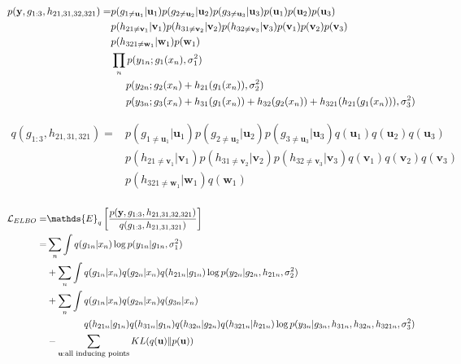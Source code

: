 \documentclass{article}
\begin{document}
\begin{align*}
	p(\mathbf{y},g_{1:3}, h_{21,31,32,321}) = &  p(g_{1\neq\mathbf{u}_1}|\mathbf{u}_1)p(g_{2\neq\mathbf{u}_2}|\mathbf{u}_2)p(g_{3\neq\mathbf{u}_3}|\mathbf{u}_3)p(\mathbf{u}_1)p(\mathbf{u}_2)p(\mathbf{u}_3)\\	
	& p(h_{21\neq\mathbf{v}_1}|\mathbf{v}_1)p(h_{31\neq\mathbf{v}_2}|\mathbf{v}_2)p(h_{32\neq\mathbf{v}_3}|\mathbf{v}_3)p(\mathbf{v}_1)p(\mathbf{v}_2)p(\mathbf{v}_3)\\	
    & p(h_{321\neq\mathbf{w}_1}|\mathbf{w}_1)p(\mathbf{w}_1)\\
    & \prod_n p(y_{1n};g_1(x_n), \sigma^2_1)\\
    & \hspace{1.5em} p(y_{2n};g_2(x_n) + h_{21}(g_1(x_n)), \sigma^2_2)\\
    & \hspace{1.5em} p(y_{3n};g_3(x_n) + h_{31}(g_1(x_n)) + h_{32}(g_2(x_n)) + h_{321}(h_{21}(g_1(x_n))), \sigma^2_3)
\end{align*}

\begin{align*}
	q(g_{1:3}, h_{21, 31, 321}) = & p(g_{1\neq\mathbf{u}_1}|\mathbf{u}_1)p(g_{2\neq\mathbf{u}_2}|\mathbf{u}_2)p(g_{3\neq\mathbf{u}_3}|\mathbf{u}_3)q(\mathbf{u}_1)q(\mathbf{u}_2)q(\mathbf{u}_3)\\
	& p(h_{21\neq\mathbf{v}_1}|\mathbf{v}_1)p(h_{31\neq\mathbf{v}_2}|\mathbf{v}_2)p(h_{32\neq\mathbf{v}_3}|\mathbf{v}_3)q(\mathbf{v}_1)q(\mathbf{v}_2)q(\mathbf{v}_3)\\	
	& p(h_{321\neq\mathbf{w}_1}|\mathbf{w}_1)q(\mathbf{w}_1)\\
\end{align*}

\begin{align*}
	\mathcal{L}_{ELBO} = & \mathds{E}_q\left[ \frac{p(\mathbf{y},g_{1:3}, h_{21,31,32,321})}{q(g_{1:3}, h_{21, 31, 321})}\right]\\
	=  & \sum_n \int q(g_{1n}|x_n) \log p(y_{1n}|g_{1n}, \sigma^2_1) \\
	& + \sum_n \int q(g_{1n}|x_n) q(g_{2n}|x_n) q(h_{21n}|g_{1n}) \log p(y_{2n}|g_{2n},h_{21n},\sigma^2_2) \\
	& + \sum_n \int q(g_{1n}|x_n)  q(g_{2n}|x_n) q(g_{3n}|x_n)\\
	& \hspace{4em} q(h_{21n}|g_{1n}) q(h_{31n}|g_{1n}) q(h_{32n}|g_{2n}) q(h_{321n}|h_{21n}) \log p(y_{3n}| g_{3n}, h_{31n}, h_{32n}, h_{321n}, \sigma^2_3)\\
	& -\sum_{\mathbf{u}: \text{\footnotesize all inducing points}} KL(q(\mathbf{u})\|p(\mathbf{u}))
\end{align*}
\end{document}
